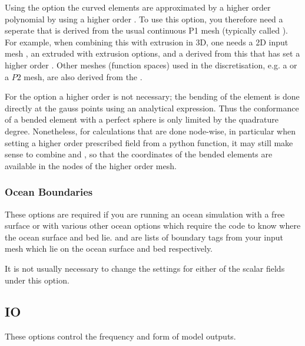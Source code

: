 Using the  option
the curved elements are approximated by a higher order polynomial by using a
higher order . To use this option, you therefore need a
seperate  that is derived from the usual continuous P1
mesh (typically called ). For example, when combining this with
extrusion in 3D, one needs a 2D input mesh , an extruded
 with extrusion options, and a  derived
from this that has set a higher order .
Other meshes (function spaces) used in the discretisation, e.g. a \PoDG or a $P2$ mesh, are
also derived from the .

For the  option a higher order
 is not necessary; the bending of the element is done
directly at the gauss points using an analytical expression. Thus the
conformance of a bended element with a perfect sphere is only limited by the
quadrature degree. Nonetheless, for calculations that are done node-wise, in
particular when setting a higher order prescribed field from a python
function, it may still make sense to combine 
and , so that the coordinates of the bended
elements are available in the nodes of the higher order mesh.

\subsubsection{Ocean Boundaries}\label{sec:ocean_boundaries}
These options are required if you are running an ocean simulation with a
free surface or with various other ocean options which require the code to
know where the ocean surface and bed lie.
 and
\onlypdf\linebreak{}
are lists of boundary tags from your input mesh which lie on the ocean
surface and bed respectively.

It is not usually necessary to change the settings for either of the scalar fields under this option.

\subsection{IO}
These options control the frequency and form of model outputs.
